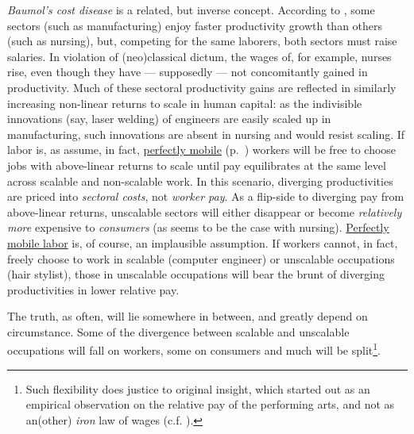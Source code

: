 \begin{enumerate}
	\emph{Baumol's cost disease} is a related, but inverse concept. According to \cite{Baumol1965}, some sectors (such as  manufacturing) enjoy faster productivity growth than others (such as nursing), but, competing for the same laborers, both sectors must raise salaries. In violation of (neo)classical dictum, the wages of, for example, nurses rise, even though they have --- supposedly --- not concomitantly gained in productivity. Much of these sectoral productivity gains are reflected in similarly increasing non-linear returns to scale in human capital: as the indivisible innovations (say, laser welding) of engineers are easily scaled up in manufacturing, such innovations are absent in nursing and would resist scaling. If labor is, as \cite{Baumol1965} assume, in fact, \hyperref[itm:perfect-factor-mobility]{perfectly mobile} (p.~\pageref{sec:perfect-competition}) workers will be free to choose jobs with above-linear returns to scale until pay equilibrates at the same level across scalable and non-scalable work. In this scenario, diverging productivities are priced into \emph{sectoral costs}, not \emph{worker pay}. As a flip-side to diverging pay from above-linear returns, unscalable sectors will either disappear or become \emph{relatively more} expensive to \emph{consumers} (as seems to be the case with nursing). \hyperref[itm:perfect-factor-mobility]{Perfectly mobile labor} is, of course, an implausible assumption. If workers cannot, in fact, freely choose to work in scalable (computer engineer) or unscalable occupations (hair stylist), those in unscalable occupations will bear the brunt of diverging productivities in lower relative pay. 
	
	The truth, as often, will lie somewhere in between, and greatly depend on circumstance. Some of the divergence between scalable and unscalable occupations will fall on workers, some on consumers and much will be split\footnote{
		Such flexibility does justice to \cite{Baumol1965} original insight, which started out as an empirical observation on the relative pay of the performing arts, and not as an(other) \emph{iron} law of wages (c.f. \citealt{Malthus1798}).}. 


\end{enumerate}
